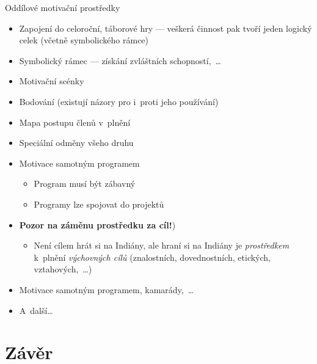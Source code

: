 \documentclass[compress, ucs, xelatex, xcolor=dvipsnames, print,
  hyperref={
    bookmarks=true,
    unicode=true,
    colorlinks=true,
    plainpages=false,
    pdfkeywords={Skaut, Junak, Skauting, Vychovna metoda},
    linkcolor=Black,
    anchorcolor=Black,
    citecolor=OliveGreen,
    filecolor=OliveGreen,
    menucolor=Black,
    urlcolor=OliveGreen,
    pdftex}
  ]{beamer}
\begin{document}
\begin{frame}{Oddílové motivační prostředky}
  \begin{itemize}
    \item Zapojení do celoroční, táborové hry --- veškerá činnost pak tvoří jeden logický celek (včetně symbolického rámce)
    \item Symbolický rámec --- získání zvláštních schopností,~\ldots
    \item Motivační scénky
    \item Bodování (existují názory pro i~proti jeho používání)
    \item Mapa postupu členů v~plnění
    \item Speciální odměny všeho druhu
    \item Motivace samotným programem
    \begin{itemize}
      \item Program musí být zábavný
      \item Programy lze spojovat do projektů
    \end{itemize}
    \item \textbf{Pozor na záměnu prostředku za cíl!})
    \begin{itemize}
      \item Není cílem hrát si na Indiány, ale hraní si na Indiány je \textit{prostředkem} k~plnění \textit{výchovných cílů} (znalostních, dovednostních, etických, vztahových,~\ldots)
    \end{itemize}
    \item Motivace samotným programem, kamarády,~\ldots
    \item A~další\ldots
  \end{itemize}
\end{frame}

\section{Závěr}
\end{document}
